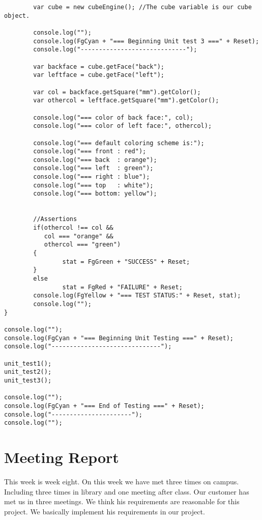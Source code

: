 \documentclass[12pt]{article}
\begin{document}
\begin{enumerate}
\begin{verbatim}
        var cube = new cubeEngine(); //The cube variable is our cube object.

        console.log("");
        console.log(FgCyan + "=== Beginning Unit test 3 ===" + Reset);
        console.log("-----------------------------");

        var backface = cube.getFace("back");
        var leftface = cube.getFace("left");

        var col = backface.getSquare("mm").getColor();
        var othercol = leftface.getSquare("mm").getColor();

        console.log("=== color of back face:", col);
        console.log("=== color of left face:", othercol);

        console.log("=== default coloring scheme is:");
        console.log("=== front : red");
        console.log("=== back  : orange");
        console.log("=== left  : green");
        console.log("=== right : blue");
        console.log("=== top   : white");
        console.log("=== bottom: yellow");


        //Assertions
        if(othercol !== col &&
           col === "orange" &&
           othercol === "green")
        {
                stat = FgGreen + "SUCCESS" + Reset;
        }
        else
                stat = FgRed + "FAILURE" + Reset;
        console.log(FgYellow + "=== TEST STATUS:" + Reset, stat);
        console.log("");
}

console.log("");
console.log(FgCyan + "=== Beginning Unit Testing ===" + Reset);
console.log("------------------------------");

unit_test1();
unit_test2();
unit_test3();

console.log("");
console.log(FgCyan + "=== End of Testing ===" + Reset);
console.log("----------------------");
console.log("");

\end{verbatim}

\section{Meeting Report}

\par This week is week eight. On this week we have met three times on campus. Including three times in library and one meeting after class. Our customer has met us in three meetings. We think his requirements are reasonable for this project. We basically implement his requirements in our project. \\


\end{enumerate}
\end{document}
